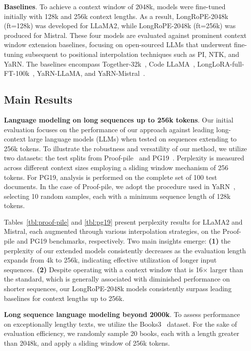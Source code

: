 \textbf{Baselines}. To achieve a context window of 2048k, models were fine-tuned initially with 128k and 256k context lengths. As a result, LongRoPE-2048k (ft=128k) was developed for LLaMA2, while LongRoPE-2048k (ft=256k) was produced for Mistral. These four models are evaluated against prominent context window extension baselines, focusing on open-sourced LLMs that underwent fine-tuning subsequent to positional interpolation techniques such as PI, NTK, and YaRN. The baselines encompass Together-32k~\cite{together}, Code LLaMA~\cite{codellama}, LongLoRA-full-FT-100k~\cite{longlora}, YaRN-LLaMA, and YaRN-Mistral~\cite{yarn}.

\subsection{Main Results}

\label{sec:mainresult}
\textbf{Language modeling on long sequences up to 256k tokens}. Our initial evaluation focuses on the performance of our approach against leading long-context large language models (LLMs) when tested on sequences extending to 256k tokens. To illustrate the robustness and versatility of our method, we utilize two datasets: the test splits from Proof-pile~\cite{pg19} and PG19~\cite{pile}. Perplexity is measured across different context sizes employing a sliding window mechanism of 256 tokens. For PG19, analysis is performed on the complete set of 100 test documents. In the case of Proof-pile, we adopt the procedure used in YaRN~\cite{yarn}, selecting 10 random samples, each with a minimum sequence length of 128k tokens.

Tables~\ref{tbl:proof-pile} and \ref{tbl:pg19} present perplexity results for LLaMA2 and Mistral, each augmented through various interpolation strategies, on the Proof-pile and PG19 benchmarks, respectively. Two main insights emerge: \textbf{(1)} the perplexity of our extended models consistently decreases as the evaluation length expands from 4k to 256k, indicating effective utilization of longer input sequences. \textbf{(2)} Despite operating with a context window that is 16$\times$ larger than the standard, which is generally associated with diminished performance on shorter sequences, our LongRoPE-2048k models consistently surpass leading baselines for context lengths up to 256k.

\textbf{Long sequence language modeling beyond 2000k}. To assess performance on exceptionally lengthy texts, we utilize the Books3~\cite{pile} dataset. For the sake of evaluation efficiency, we randomly sample 20 books, each with a length greater than 2048k, and apply a sliding window of 256k tokens.

